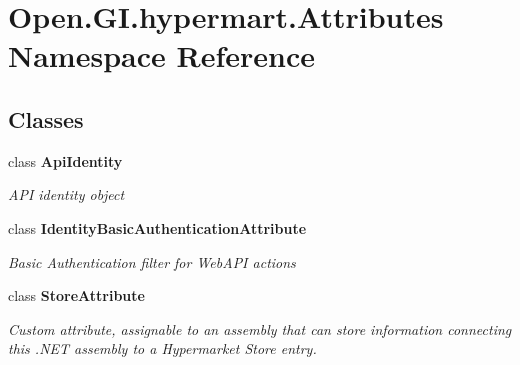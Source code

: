 \section{Open.\+G\+I.\+hypermart.\+Attributes Namespace Reference}
\label{namespace_open_1_1_g_i_1_1hypermart_1_1_attributes}
\subsection*{Classes}
\begin{DoxyCompactItemize}
\item 
class \textbf{ Api\+Identity}
\begin{DoxyCompactList}\small\item\em A\+PI identity object \end{DoxyCompactList}\item 
class \textbf{ Identity\+Basic\+Authentication\+Attribute}
\begin{DoxyCompactList}\small\item\em Basic Authentication filter for Web\+A\+PI actions \end{DoxyCompactList}\item 
class \textbf{ Store\+Attribute}
\begin{DoxyCompactList}\small\item\em Custom attribute, assignable to an assembly that can store information connecting this .N\+ET assembly to a Hypermarket Store entry. \end{DoxyCompactList}\end{DoxyCompactItemize}
